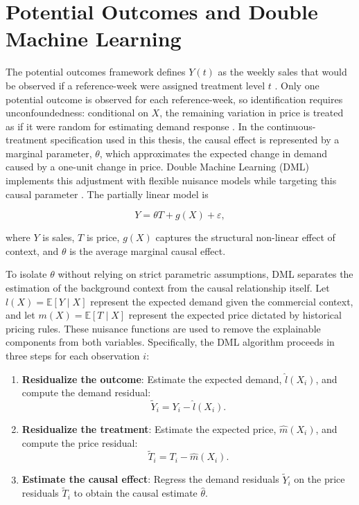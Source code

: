 \section{Potential Outcomes and Double Machine Learning}
\label{sec:potential-outcomes-dml}

The potential outcomes framework defines $Y(t)$ as the weekly sales that would be observed if a reference-week were assigned treatment level $t$ \cite{rubin1974causal,imbens2015causal}. Only one potential outcome is observed for each reference-week, so identification requires unconfoundedness: conditional on $X$, the remaining variation in price is treated as if it were random for estimating demand response \cite{angrist2009mostlyharmless}. In the continuous-treatment specification used in this thesis, the causal effect is represented by a marginal parameter, $\theta$, which approximates the expected change in demand caused by a one-unit change in price. Double Machine Learning (DML) implements this adjustment with flexible nuisance models while targeting this causal parameter \cite{chernozhukov2018dml}. The partially linear model is

\begin{equation}
Y = \theta T + g(X) + \varepsilon,
\label{eq:plr-model}
\end{equation}

where $Y$ is sales, $T$ is price, $g(X)$ captures the structural non-linear effect of context, and $\theta$ is the average marginal causal effect.

To isolate $\theta$ without relying on strict parametric assumptions, DML separates the estimation of the background context from the causal relationship itself. Let $l(X)=\mathbb{E}[Y\mid X]$ represent the expected demand given the commercial context, and let $m(X)=\mathbb{E}[T\mid X]$ represent the expected price dictated by historical pricing rules. These nuisance functions are used to remove the explainable components from both variables. Specifically, the DML algorithm proceeds in three steps for each observation $i$:

\begin{enumerate}
    \item \textbf{Residualize the outcome}: Estimate the expected demand, $\hat{l}(X_i)$, and compute the demand residual:
    \begin{equation}
    \tilde{Y}_i = Y_i - \hat{l}(X_i).
    \end{equation}
    \item \textbf{Residualize the treatment}: Estimate the expected price, $\hat{m}(X_i)$, and compute the price residual:
    \begin{equation}
    \tilde{T}_i = T_i - \hat{m}(X_i).
    \end{equation}
    \item \textbf{Estimate the causal effect}: Regress the demand residuals $\tilde{Y}_i$ on the price residuals $\tilde{T}_i$ to obtain the causal estimate $\hat{\theta}$.
\end{enumerate}

